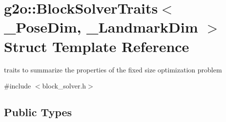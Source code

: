\hypertarget{structg2o_1_1_block_solver_traits}{}\section{g2o\+:\+:Block\+Solver\+Traits$<$ \+\_\+\+Pose\+Dim, \+\_\+\+Landmark\+Dim $>$ Struct Template Reference}
\label{structg2o_1_1_block_solver_traits}


traits to summarize the properties of the fixed size optimization problem  




{\ttfamily \#include $<$block\+\_\+solver.\+h$>$}

\subsection*{Public Types}
